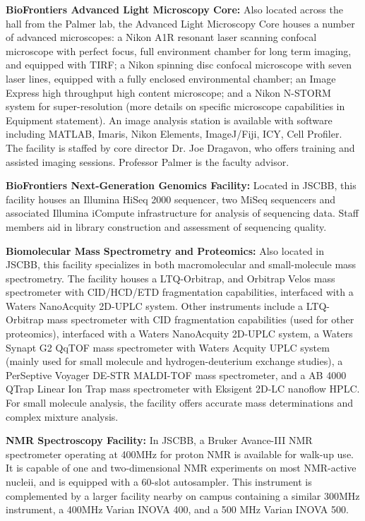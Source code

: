   {\bf BioFrontiers Advanced Light Microscopy Core:} Also located across the hall from the Palmer lab, the Advanced Light Microscopy Core houses a number of advanced microscopes: a Nikon A1R resonant laser scanning confocal microscope with perfect focus, full environment chamber for long term imaging, and equipped with TIRF; a Nikon spinning disc confocal microscope with seven laser lines, equipped with a fully enclosed environmental chamber; an Image Express high throughput high content microscope; and a Nikon N-STORM system for super-resolution (more details on specific microscope capabilities in Equipment statement). An image analysis station is available with software including MATLAB, Imaris, Nikon Elements, ImageJ/Fiji, ICY, Cell Profiler. The facility is staffed by core director Dr. Joe Dragavon, who offers  training and assisted imaging sessions. Professor Palmer is the faculty advisor.

  {\bf BioFrontiers Next-Generation Genomics Facility:} Located in JSCBB, this facility houses an Illumina HiSeq 2000 sequencer, two MiSeq sequencers and associated Illumina iCompute infrastructure for analysis of sequencing data. Staff members aid in library construction and assessment of sequencing quality.

  {\bf Biomolecular Mass Spectrometry and Proteomics:} Also located in JSCBB, this facility specializes in both macromolecular and small-molecule mass spectrometry. The facility houses a LTQ-Orbitrap, and Orbitrap Velos mass spectrometer with CID/HCD/ETD fragmentation capabilities, interfaced with a Waters NanoAcquity 2D-UPLC system. Other instruments include a LTQ-Orbitrap mass spectrometer with CID fragmentation capabilities (used for other proteomics), interfaced with a Waters NanoAcquity 2D-UPLC system, a Waters Synapt G2 QqTOF mass spectrometer with Waters Acquity UPLC system (mainly used for small molecule and hydrogen-deuterium exchange studies), a PerSeptive Voyager DE-STR MALDI-TOF mass spectrometer, and a AB 4000 QTrap Linear Ion Trap mass spectrometer with Eksigent 2D-LC nanoflow HPLC. For small molecule analysis, the facility offers accurate mass determinations and complex mixture analysis.

  {\bf NMR Spectroscopy Facility:} In JSCBB, a Bruker Avance-III NMR spectrometer operating at 400MHz for proton NMR is available for walk-up use. It is capable of one and two-dimensional NMR experiments on most NMR-active nucleii, and is equipped with a 60-slot autosampler. This instrument is complemented by a larger facility nearby on campus containing a similar 300MHz instrument, a 400MHz Varian INOVA 400, and a 500 MHz Varian INOVA 500.

